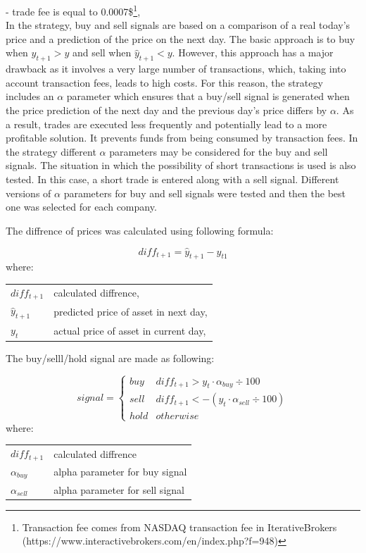 \documentclass[11pt]{article} %
\makeatletter
\newenvironment{conditions}
  {\par\vspace{\abovedisplayskip}\noindent\begin{tabular}{>{$}l<{$} @{${}={}$} l}}
  {\end{tabular}\par\vspace{\belowdisplayskip}}
\makeatother
\begin{document}
\noindent- trade fee is equal to 0.0007\$\footnote{Transaction fee comes from NASDAQ transaction fee in IterativeBrokers (https://www.interactivebrokers.com/en/index.php?f=948)}, \\

In the strategy, buy and sell signals are based on a comparison of a real today's price and a prediction of the price on the next day. The basic approach is to buy when $\hat{y}_{t+1} > y$ and sell when $\hat{y}_{t+1} < y$. However, this approach has a major drawback as it involves a very large number of transactions, which, taking into account transaction fees, leads to high costs. For this reason, the strategy includes an $\alpha$ parameter which ensures that a buy/sell signal is generated when the price prediction of the next day and the previous day's price differs by $\alpha$. As a result, trades are executed less frequently and potentially lead to a more profitable solution. It prevents funds from being consumed by transaction fees. In the strategy different $\alpha$ parameters may be considered for the buy and sell signals. The situation in which the possibility of short transactions is used is also tested. In this case, a short trade is entered along with a sell signal. 
Different versions of $\alpha$ parameters for buy and sell signals were tested and then the best one was selected for each company.

\pagebreak
The diffrence of prices was calculated using following formula:

\begin{equation}  diff_{t+1} = \hat{y}_{t+1} - y_{t1} \end{equation}
where:
\begin{conditions}
diff_{t+1} & calculated diffrence, \\ 
 \hat{y}_{t+1}     &   predicted price of asset in next day,\\
 y_{t}     &  actual price of asset in current day,\\   
\end{conditions}

 \begin{flushleft} The buy/selll/hold signal are made as following: \end{flushleft} 
\begin{equation}
signal =  \left\{\begin{array}{ll} buy & diff_{t+1} >  y_{t} \cdot  \alpha_{buy} \div 100 \\ sell & diff_{t+1} <  -(y_{t} \cdot  \alpha_{sell} \div 100)\\  hold & otherwise \end{array}\right.
\end{equation}
where:
\begin{conditions}
diff_{t+1} & calculated diffrence \\ 
\alpha_{buy}     &  alpha parameter for buy signal \\   
\alpha_{sell}     &  alpha parameter for sell signal\\   
\end{conditions}
\end{document}
